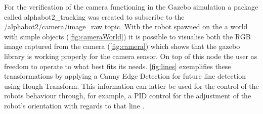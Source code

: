 \documentclass[conference]{IEEEtran}
\begin{document}
For the verification of the camera functioning in the Gazebo simulation a package called alphabot2\_tracking was created to subscribe to the /alphabot2/camera/image\_raw topic. With the robot spawned on the a world with simple objects (\cref{fig:cameraWorld}) it is possible to visualise both the RGB image captured from the camera (\cref{fig:camera}) which shows that the gazebo library is working properly for the camera sensor. On top of this node the user as freedom to operate to what best fits its needs. \cref{fig:lines} exemplifies these transformations by applying a Canny Edge Detection for future line detection using Hough Transform. This information can latter be used for the control of the robots behaviour through, for example, a PID control for the adjustment of the robot's orientation with regards to that line \cite{HTopencv}.
\end{document}
